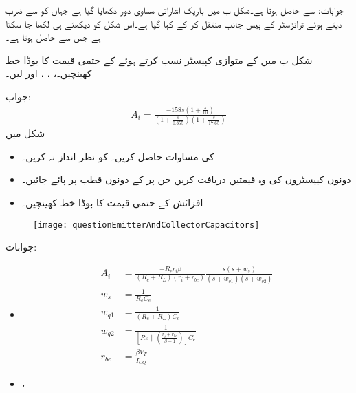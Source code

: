 جوابات: سے  حاصل ہوتا ہے۔شکل  ب میں باریک اشاراتی مساوی دور دکھایا گیا ہے جہاں
  کو  سے ضرب دیتے ہوئے ٹرانزسٹر کے بیس  جانب منتقل کر کے  کہا گیا ہے۔اس شکل کو دیکھتے ہی   لکھا جا سکتا ہے جس سے  حاصل ہوتا ہے۔

شکل  ب میں   کے متوازی  کپیسٹر نسب کرتے ہوئے  کے حتمی قیمت کا بوڈا خط کھینچیں۔، ، ،  اور  لیں۔

جواب:
\begin{align*}
A_i=\frac{-158 s \left(1+\frac{s}{10} \right)}{\left(1+\frac{s}{0.355}\right) \left(1+\frac{s}{17.65} \right)}
\end{align*}
شکل  میں
\begin{itemize}
\item
{} کی مساوات حاصل کریں۔ کو نظر انداز نہ کریں۔
\item
دونوں کپیسٹروں کی وہ قیمتیں دریافت کریں جن پر  کے دونوں قطب  پر پائے جائیں۔
\item
افزائش   کے حتمی قیمت کا بوڈا خط کھینچیں۔
\end{itemize}
%
\begin{figure}
\centering
\texttt{[image: questionEmitterAndCollectorCapacitors]}
\caption{}
\label{شکل_تعددی_ردعمل_سوال_مخارج_اور_محاصل_کپیسٹر}
\end{figure}

جوابات:
\begin{itemize}
\item
%
\begin{align*}
A_i&=\frac{-R_c r_i \beta}{\left(R_c+R_L\right)\left(r_i+r_{be} \right)} \frac{s \left(s+w_s \right)}{\left(s+w_{q1} \right)\left(s+w_{q2} \right)}\\
w_s&=\frac{1}{R_e C_e}\\
w_{q1}&=\frac{1}{\left(R_c+R_L \right) C_c}\\
w_{q2}&=\frac{1}{\left[Re \mathbin \| \left(\frac{r_i+r_{be}}{\beta+1} \right)\right] C_e}\\
r_{be}&=\frac{\beta V_T}{I_{CQ}}
\end{align*}
%
\item
{}، 
\end{itemize}

